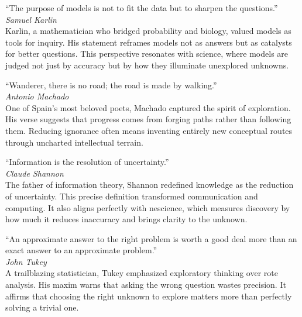 \vspace{1em}

\noindent
\textquotedblleft The purpose of models is not to fit the data but to sharpen the questions.\textquotedblright \\
\emph{Samuel Karlin} \\
Karlin, a mathematician who bridged probability and biology, valued models as tools for inquiry. His statement reframes models not as answers but as catalysts for better questions. This perspective resonates with science, where models are judged not just by accuracy but by how they illuminate unexplored unknowns.

\vspace{1em}

\noindent
\textquotedblleft Wanderer, there is no road; the road is made by walking.\textquotedblright \\
\emph{Antonio Machado} \\
One of Spain's most beloved poets, Machado captured the spirit of exploration. His verse suggests that progress comes from forging paths rather than following them. Reducing ignorance often means inventing entirely new conceptual routes through uncharted intellectual terrain.

\vspace{1em}

\noindent
\textquotedblleft Information is the resolution of uncertainty.\textquotedblright \\
\emph{Claude Shannon} \\
The father of information theory, Shannon redefined knowledge as the reduction of uncertainty. This precise definition transformed communication and computing. It also aligns perfectly with nescience, which measures discovery by how much it reduces inaccuracy and brings clarity to the unknown.

\vspace{1em}

\noindent
\textquotedblleft An approximate answer to the right problem is worth a good deal more than an exact answer to an approximate problem.\textquotedblright \\
\emph{John Tukey} \\
A trailblazing statistician, Tukey emphasized exploratory thinking over rote analysis. His maxim warns that asking the wrong question wastes precision. It affirms that choosing the right unknown to explore matters more than perfectly solving a trivial one.

\vspace{1em}

